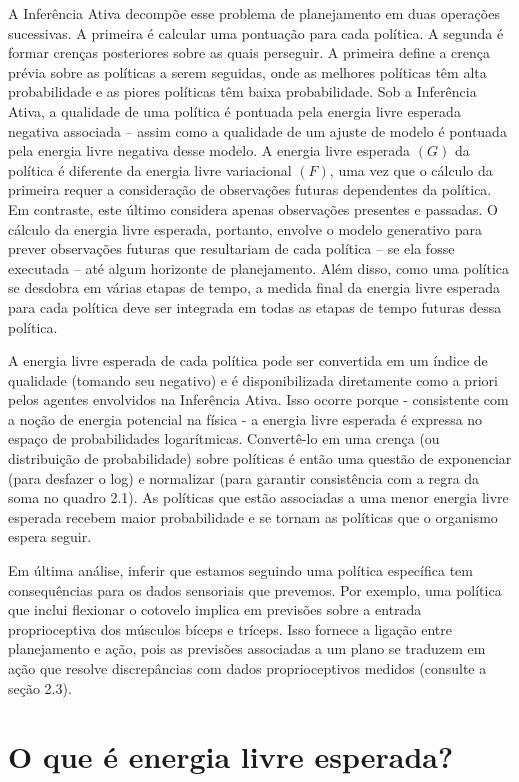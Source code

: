 \documentclass[
  12pt,
]{book}
\begin{document}
A Inferência Ativa decompõe esse problema de planejamento em duas operações sucessivas. A primeira é calcular uma pontuação para cada política. A segunda é formar crenças posteriores sobre as quais perseguir. A primeira define a crença prévia sobre as políticas a serem seguidas, onde as melhores políticas têm alta probabilidade e as piores políticas têm baixa probabilidade. Sob a Inferência Ativa, a qualidade de uma política é pontuada pela energia livre esperada negativa associada -- assim como a qualidade de um ajuste de modelo é pontuada pela energia livre negativa desse modelo. A energia livre esperada \((G)\) da política é diferente da energia livre variacional \((F)\), uma vez que o cálculo da primeira requer a consideração de observações futuras dependentes da política. Em contraste, este último considera apenas observações presentes e passadas. O cálculo da energia livre esperada, portanto, envolve o modelo generativo para prever observações futuras que resultariam de cada política -- se ela fosse executada -- até algum horizonte de planejamento. Além disso, como uma política se desdobra em várias etapas de tempo, a medida final da energia livre esperada para cada política deve ser integrada em todas as etapas de tempo futuras dessa política.

A energia livre esperada de cada política pode ser convertida em um índice de qualidade (tomando seu negativo) e é disponibilizada diretamente como a priori pelos agentes envolvidos na Inferência Ativa. Isso ocorre porque - consistente com a noção de energia potencial na física - a energia livre esperada é expressa no espaço de probabilidades logarítmicas. Convertê-lo em uma crença (ou distribuição de probabilidade) sobre políticas é então uma questão de exponenciar (para desfazer o log) e normalizar (para garantir consistência com a regra da soma no quadro 2.1). As políticas que estão associadas a uma menor energia livre esperada recebem maior probabilidade e se tornam as políticas que o organismo espera seguir.

Em última análise, inferir que estamos seguindo uma política específica tem consequências para os dados sensoriais que prevemos. Por exemplo, uma política que inclui flexionar o cotovelo implica em previsões sobre a entrada proprioceptiva dos músculos bíceps e tríceps. Isso fornece a ligação entre planejamento e ação, pois as previsões associadas a um plano se traduzem em ação que resolve discrepâncias com dados proprioceptivos medidos (consulte a seção 2.3).

\hypertarget{o-que-uxe9-energia-livre-esperada}{%
\section{O que é energia livre esperada?}\label{o-que-uxe9-energia-livre-esperada}}
\end{document}
